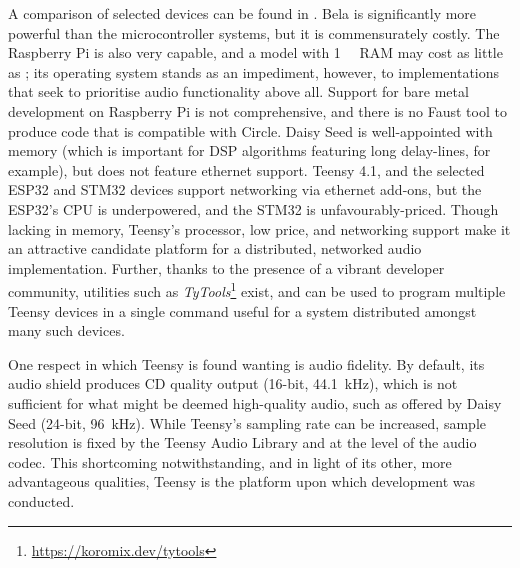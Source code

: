 A comparison of selected devices can be found in
.
Bela is significantly more powerful than the microcontroller systems, but it is
commensurately costly.
The Raspberry Pi is also very capable, and a model with \qty{1}{\giga\byte} RAM
may cost as little as ;
its operating system stands as an impediment, however, to implementations that
seek to prioritise audio functionality above all.
Support for bare metal development on Raspberry Pi is not comprehensive, and
there is no Faust tool to produce code that is compatible with Circle.
Daisy Seed is well-appointed with memory (which is important for DSP algorithms
featuring long delay-lines, for example), but does not feature ethernet support.
Teensy 4.1, and the selected ESP32 and STM32 devices support networking via
ethernet add-ons, but the ESP32's CPU is underpowered, and the STM32 is
unfavourably-priced.
Though lacking in memory, Teensy's processor, low price, and networking support
make it an attractive candidate platform for a distributed, networked audio
implementation.
Further, thanks to the presence of a vibrant developer community, utilities such
as \textit{TyTools}\footnote{\url{https://koromix.dev/tytools}} exist, and can
be used to program multiple Teensy devices in a single command \textemdash{}
useful for a system distributed amongst many such devices.

One respect in which Teensy is found wanting is audio fidelity.
By default, its audio shield produces CD quality output (16-bit,
\qty{44.1}{\kHz}), which is not sufficient for what might be deemed high-quality
audio, such as offered by Daisy Seed (24-bit, \qty{96}{\kHz}).
While Teensy's sampling rate can be increased, sample resolution is fixed by
the Teensy Audio Library and at the level of the audio codec.
This shortcoming notwithstanding, and in light of its other, more advantageous
qualities, Teensy is the platform upon which development was conducted.

